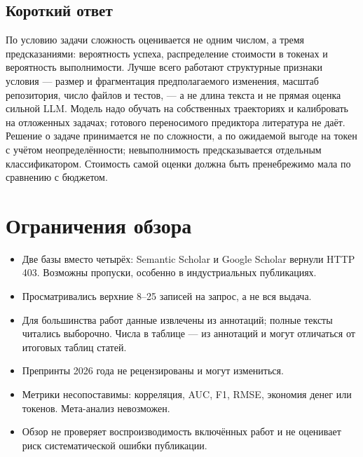 \documentclass[11pt,a4paper]{article}
\begin{document}
\subsection{Короткий ответ}

По условию задачи сложность оценивается не одним числом, а тремя
предсказаниями: вероятность успеха, распределение стоимости в токенах и
вероятность выполнимости. Лучше всего работают структурные признаки условия —
размер и фрагментация предполагаемого изменения, масштаб репозитория, число
файлов и тестов, — а не длина текста и не прямая оценка сильной LLM. Модель
надо обучать на собственных траекториях и калибровать на отложенных задачах;
готового переносимого предиктора литература не даёт. Решение о задаче
принимается не по сложности, а по ожидаемой выгоде на токен с учётом
неопределённости; невыполнимость предсказывается отдельным классификатором.
Стоимость самой оценки должна быть пренебрежимо мала по сравнению с бюджетом.

\section{Ограничения обзора}

\begin{itemize}
  \item Две базы вместо четырёх: Semantic Scholar и Google Scholar вернули
        HTTP 403. Возможны пропуски, особенно в индустриальных публикациях.
  \item Просматривались верхние 8--25 записей на запрос, а не вся выдача.
  \item Для большинства работ данные извлечены из аннотаций; полные тексты
        читались выборочно. Числа в таблице — из аннотаций и могут отличаться
        от итоговых таблиц статей.
  \item Препринты 2026 года не рецензированы и могут измениться.
  \item Метрики несопоставимы: корреляция, AUC, F1, RMSE, экономия денег или
        токенов. Мета-анализ невозможен.
  \item Обзор не проверяет воспроизводимость включённых работ и не оценивает
        риск систематической ошибки публикации.
\end{itemize}



\end{document}
